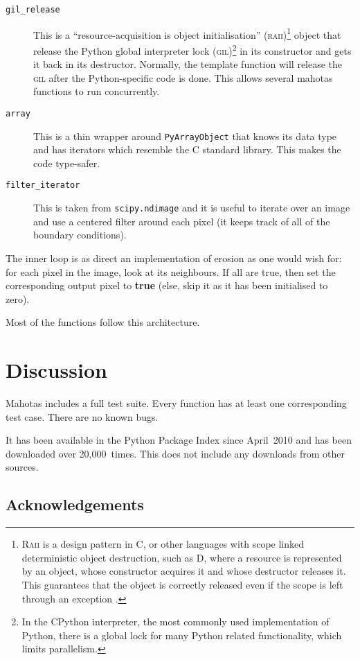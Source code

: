 \documentclass{article}
\newcommand*{\cpp}{{C\nolinebreak[4]\hspace{-.05em}\raisebox{.4ex}{\tiny\textbf{++}}}}
\let\code\texttt
\begin{document}
\begin{description}
\item[\code{gil\_release}] This is a ``resource-acquisition is object
initialisation'' (\textsc{raii})\footnote{\textsc{Raii} is a design pattern in
\cpp{}, or other languages with scope linked deterministic object destruction,
such as D, where a resource is represented by an object, whose constructor
acquires it and whose destructor releases it. This guarantees that the object
is correctly released even if the scope is left through an exception
\citep{Stroustrup1994}.} object that release the Python global interpreter lock
(\textsc{gil})\footnote{In the CPython interpreter, the most commonly used
implementation of Python, there is a global lock for many Python related
functionality, which limits parallelism.} in its constructor and gets it back
in its destructor. Normally, the template function will release the
\textsc{gil} after the Python-specific code is done. This allows several
mahotas functions to run concurrently.
\item[\code{array}] This is a thin wrapper around \code{PyArrayObject} that
knows its data type and has iterators which resemble the \cpp{} standard
library. This makes the code type-safer.
\item[\code{filter\_iterator}] This is taken from \code{scipy.ndimage} and it
is useful to iterate over an image and use a centered filter around each pixel
(it keeps track of all of the boundary conditions).
\end{description}

The inner loop is as direct an implementation of erosion as one would wish for:
for each pixel in the image, look at its neighbours. If all are true, then set
the corresponding output pixel to \textbf{true} (else, skip it as it has been
initialised to zero).

Most of the functions follow this architecture.

\section{Discussion}

Mahotas includes a full test suite. Every function has at least one
corresponding test case. There are no known bugs.

It has been available in the Python Package Index since April~2010 and has been
downloaded over 20,000~times. This does not include any downloads from other
sources.

\subsection*{Acknowledgements}
\end{document}
